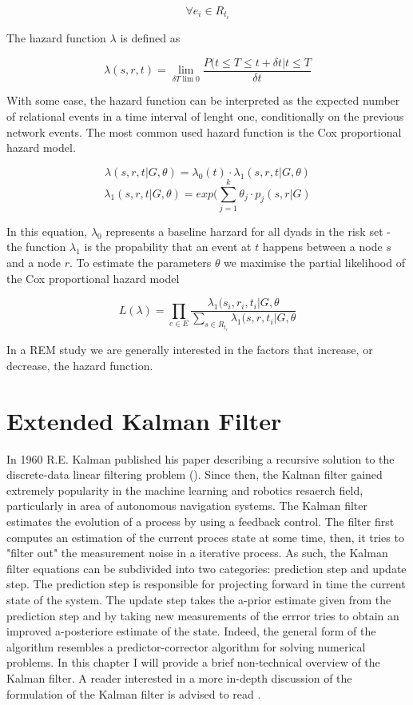 \documentclass[mscthesis]{usiinfthesis}
\begin{document}
\[
\forall e_{i} \in R_{t_i}
\]

The hazard function $\lambda$ is defined as

\[
\lambda(s, r, t) = \lim_{\delta T \lim 0} \frac{P(t \leq T \leq t + \delta t | t \leq T}{\delta t}
\]

With some ease, the hazard function can be interpreted as the expected number of relational events in a time interval of lenght one, conditionally on the previous network events. The most common used hazard function is the Cox proportional hazard model. 


\[
\lambda(s, r, t|G, \theta) = \lambda_0(t) \cdot \lambda_1(s, r, t|G, \theta)
\]
\[
\lambda_1(s, r, t|G, \theta) = exp(\sum_{j=1}^k \theta_j \cdot p_j(s, r|G)
\]

In this equation, $\lambda_0$ represents a baseline harzard for all dyads in the risk set - the function $\lambda_1$ is the propability that an event at $t$ happens between a node $s$ and a node $r$. To estimate the parameters $\theta$ we maximise the partial likelihood of the Cox proportional hazard model 

\[
L(\lambda) =  \prod_{e \in E} \frac{\lambda_1(s_i, r_i, t_i | G, \theta}{ \sum_{s \in R_{t_i}} \lambda_1(s, r, t_i | G, \theta}
\]



In a REM study we are generally interested in the factors that increase, or decrease, the hazard function.


\section{Extended Kalman Filter}

In 1960 R.E. Kalman published his paper describing a recursive solution to the discrete-data linear filtering problem (\citet{paper:kalmanfilter}). Since then, the Kalman filter gained extremely popularity in the machine learning and robotics resaerch field, particularly in area of autonomous navigation systems. The Kalman filter estimates the evolution of a process by using a feedback control. The filter first computes an estimation of the current proces state at some time, then, it tries to "filter out" the measurement  noise in a iterative process. As such, the Kalman filter equations can be subdivided into two categories: prediction step and update step. The prediction step is responsible for projecting forward in time the current state of the system. The update step takes the a-prior estimate given from the prediction step and by taking new measurements of the errror tries to obtain an improved a-posteriore estimate of the state. Indeed, the general form of the algorithm resembles a predictor-corrector algorithm for solving numerical problems. In this chapter I will provide a brief non-technical overview of the Kalman filter. A reader interested in a more in-depth discussion of the formulation of the Kalman filter is advised to read \citet{paper:Maybeck79}.
\end{document}
